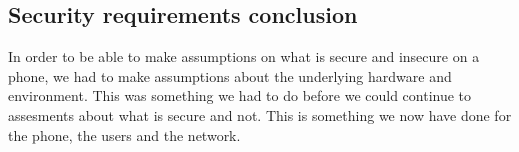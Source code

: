 \subsection{Security requirements conclusion}
In order to be able to make assumptions on what is secure and insecure on a phone, we had to make assumptions about the underlying hardware and environment. This was something we had to do before we could continue to assesments about what is secure and not. This is something we now have done for the phone, the users and the network.

